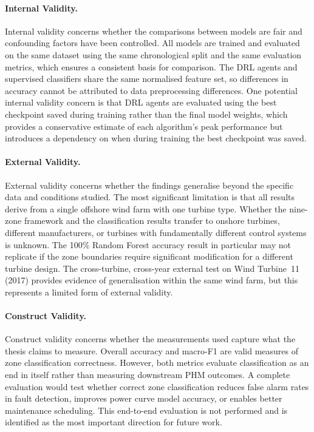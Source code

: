 \paragraph{Internal Validity.}
Internal validity concerns whether the comparisons between models are fair and confounding
factors have been controlled. All models are trained and evaluated on the same dataset
using the same chronological split and the same evaluation metrics, which ensures a
consistent basis for comparison. The DRL agents and supervised classifiers share the same
normalised feature set, so differences in accuracy cannot be attributed to data
preprocessing differences. One potential internal validity concern is that DRL agents are
evaluated using the best checkpoint saved during training rather than the final model
weights, which provides a conservative estimate of each algorithm's peak performance but
introduces a dependency on when during training the best checkpoint was saved.

\paragraph{External Validity.}
External validity concerns whether the findings generalise beyond the specific data and
conditions studied. The most significant limitation is that all results derive from a
single offshore wind farm with one turbine type. Whether the nine-zone framework and the
classification results transfer to onshore turbines, different manufacturers, or turbines
with fundamentally different control systems is unknown. The 100\% Random Forest accuracy
result in particular may not replicate if the zone boundaries require significant
modification for a different turbine design. The cross-turbine, cross-year external test
on Wind Turbine~11 (2017) provides evidence of generalisation within the same wind farm,
but this represents a limited form of external validity.

\paragraph{Construct Validity.}
Construct validity concerns whether the measurements used capture what the thesis claims
to measure. Overall accuracy and macro-F1 are valid measures of zone classification
correctness. However, both metrics evaluate classification as an end in itself rather
than measuring downstream PHM outcomes. A complete evaluation would test whether correct
zone classification reduces false alarm rates in fault detection, improves power curve
model accuracy, or enables better maintenance scheduling. This end-to-end evaluation is
not performed and is identified as the most important direction for future work.

